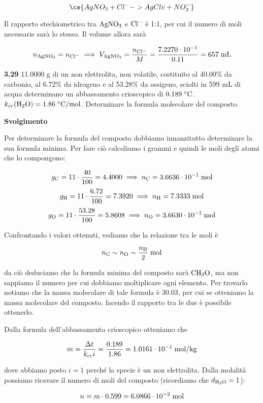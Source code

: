 $$\ce{AgNO_3 + Cl^- -> Ag Cl v + NO_3^-}$$

Il rapporto stechiometrico tra $\rm AgNO_3$ e $\rm Cl^-$ è 1:1, per cui il numero di moli necessarie sarà lo stesso. Il volume allora sarà

$$n_{\rm AgNO_3}=n_{\rm Cl^-}
\implies
V_{\rm AgNO_3}=\frac{n_{\rm Cl^-}}{M}=\frac{7.2270 \cdot 10^{-1}}{0.11}=657 \; \rm mL$$

\textbf{3.29} 11.0000 g di un non elettrolita, non volatile, costituito al 40.00\% da carbonio, al 6.72\% da idrogeno e al 53.28\% da ossigeno, sciolti in 599 mL di acqua determinano un abbassamento crioscopico di $0.189 \; ^{\circ} \rm C$. $k_{cr}(\text{H}_2\text{O})=1.86 \; ^{\circ} \rm C/mol$. Determinare la formula molecolare del composto.

\vspace{0.2cm}\large\textbf{Svolgimento}\normalsize

\vspace{0.2cm} Per determinare la formula del composto dobbiamo innanzitutto determinare la sua formula minima. Per fare ciò calcoliamo i grammi e quindi le moli degli atomi che lo compongono:

$$g_{\rm C}=11 \cdot \frac{40}{100}=4.4000
\implies
n_{\rm C}=3.6636 \cdot 10^{-1} \; \text{mol}$$
$$g_{\rm H}=11 \cdot \frac{6.72}{100}=7.3920
\implies
n_{\rm H}=7.3333 \; \text{mol}$$
$$g_{\rm O}=11 \cdot \frac{53.28}{100}=5.8608
\implies
n_{\rm O}=3.6630 \cdot 10^{-1} \; \text{mol}$$

Confrontando i valori ottenuti, vediamo che la relazione tra le moli è

$$n_{\rm C} \sim n_{\rm O} \sim \frac{n_{\rm H}}{2} \; \rm mol$$

da ciò deduciamo che la formula minima del composto sarà $\rm CH_2O$, ma non sappiamo il numero per cui dobbiamo moltiplicare ogni elemento. Per trovarlo notiamo che la massa molecolare di tale formula è 30.03, per cui se otteniamo la massa molecolare del composto, facendo il rapporto tra le due è possibile ottenerlo.

Dalla formula dell'abbassamento crioscopico otteniamo che

$$m=\frac{\Delta t}{k_{cr} i}=\frac{0.189}{1.86}
=1.0161 \cdot 10^{-1} \; \rm mol/kg$$

dove abbiamo posto $i=1$ perché la specie è un non elettrolita. Dalla molalità possiamo ricavare il numero di moli del composto (ricordiamo che $d_{\rm H_2O}=1$):

$$n=m \cdot 0.599=6.0866 \cdot 10^{-2} \; \rm mol$$

